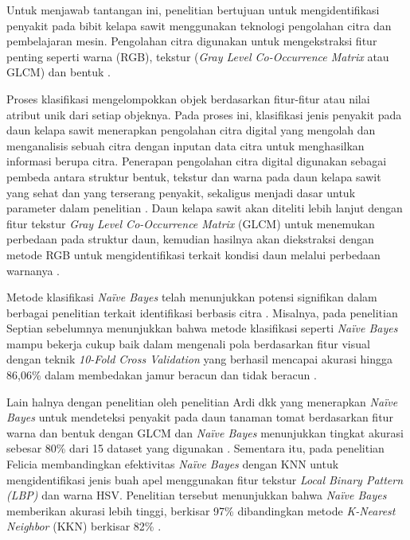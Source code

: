 Untuk menjawab tantangan ini, penelitian bertujuan untuk mengidentifikasi penyakit pada bibit kelapa sawit menggunakan teknologi pengolahan citra dan pembelajaran mesin. Pengolahan citra digunakan untuk mengekstraksi fitur penting seperti warna (RGB), tekstur (\textit {Gray Level Co-Occurrence Matrix} atau GLCM) dan bentuk \cite{yunianto2021klasifikasi}.

Proses klasifikasi mengelompokkan objek berdasarkan fitur-fitur atau nilai atribut unik dari setiap objeknya. Pada proses ini, klasifikasi jenis penyakit pada daun kelapa sawit menerapkan pengolahan citra digital yang mengolah dan menganalisis sebuah citra dengan inputan data citra untuk menghasilkan informasi berupa citra. Penerapan pengolahan citra digital digunakan sebagai pembeda antara struktur bentuk, tekstur dan warna pada daun kelapa sawit yang sehat dan yang terserang penyakit, sekaligus menjadi dasar untuk parameter dalam penelitian \cite{elvira2021klasifikasi}. Daun kelapa sawit akan diteliti lebih lanjut dengan fitur tekstur \textit {Gray Level Co-Occurrence Matrix} (GLCM) untuk menemukan perbedaan pada struktur daun, kemudian hasilnya akan diekstraksi dengan metode RGB untuk mengidentifikasi terkait kondisi daun melalui perbedaan warnanya \cite{sukmanapeningkatan}.

Metode klasifikasi \textit{Naïve Bayes} telah menunjukkan potensi signifikan dalam berbagai penelitian terkait identifikasi berbasis citra \cite{afriansyah2024algoritma}. Misalnya, pada penelitian Septian sebelumnya menunjukkan bahwa metode klasifikasi seperti \textit{Naïve Bayes} mampu bekerja cukup baik dalam mengenali pola berdasarkan fitur visual dengan teknik \textit{10-Fold Cross Validation} yang berhasil mencapai akurasi hingga 86,06\% dalam membedakan jamur beracun dan tidak beracun \cite{prayoga2019implementasi}.

Lain halnya dengan penelitian oleh penelitian Ardi dkk yang menerapkan \textit{Naïve Bayes} untuk mendeteksi penyakit pada daun tanaman tomat berdasarkan fitur warna dan bentuk dengan GLCM dan \textit{Naïve Bayes} menunjukkan tingkat akurasi sebesar 80\% dari 15 dataset yang digunakan \cite{nainggolan2022identifikasi}. Sementara itu, pada penelitian Felicia membandingkan efektivitas \textit{Naïve Bayes} dengan KNN untuk mengidentifikasi jenis buah apel menggunakan fitur tekstur \textit{Local Binary Pattern (LBP)} dan warna HSV. Penelitian tersebut menunjukkan bahwa \textit{Naïve Bayes} memberikan akurasi lebih tinggi, berkisar 97\% dibandingkan metode \textit {K-Nearest Neighbor} (KKN) berkisar 82\% \cite{febriana2021perbandingan}.

